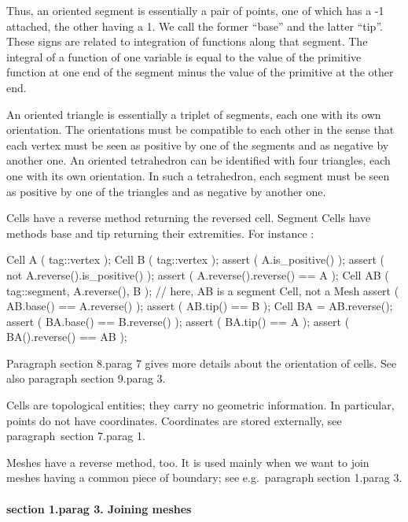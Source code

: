 Thus, an oriented segment is essentially a pair of points, one of which has a \hbox{-1}
attached, the other having a 1.
We call the former ``base'' and the latter ``tip''.
These signs are related to integration of functions along that segment.
The integral of a function of one variable is equal to the value of the 
primitive function at one end of the segment minus the value of the primitive at the other end.

An oriented triangle is essentially a triplet of segments, each one with its own orientation.
The orientations must be compatible to each other in the sense that each vertex 
must be seen as positive by one of the segments and as negative by another one.
An oriented tetrahedron can be identified with four triangles, each one with its own
orientation.
In such a tetrahedron, each segment must be seen as positive by one of the triangles and
as negative by another one.

Cells have a {\codett reverse} method returning the reversed cell.
Segment {\codett Cell}s have methods {\codett base} and {\codett tip} returning their extremities.
For instance :

\verbatim
   Cell A ( tag::vertex );  Cell B ( tag::vertex );
   assert ( A.is_positive() );
   assert ( not A.reverse().is_positive() );
   assert ( A.reverse().reverse() == A );
   Cell AB ( tag::segment, A.reverse(), B );
   // here, AB is a segment Cell, not a Mesh
   assert ( AB.base() == A.reverse() );
   assert ( AB.tip() == B );
   Cell BA = AB.reverse();
   assert ( BA.base() == B.reverse() );
   assert ( BA.tip() == A );
   assert ( BA().reverse() == AB );
\endverbatim

Paragraph \numb section 8.\numb parag 7 gives more details about the orientation of cells.
See also paragraph \numb section 9.\numb parag 3.

Cells are topological entities; they carry no geometric information.
In particular, points do not have coordinates.
Coordinates are stored externally, see paragraph~\numb section 7.\numb parag 1.

{\codett Mesh}es have a {\codett reverse} method, too.
It is used mainly when we want to {\codett join} meshes having a common piece of boundary;
see e.g.\ paragraph \numb section 1.\numb parag 3.


\paragraph{\numb section 1.\numb parag 3. Joining meshes}

